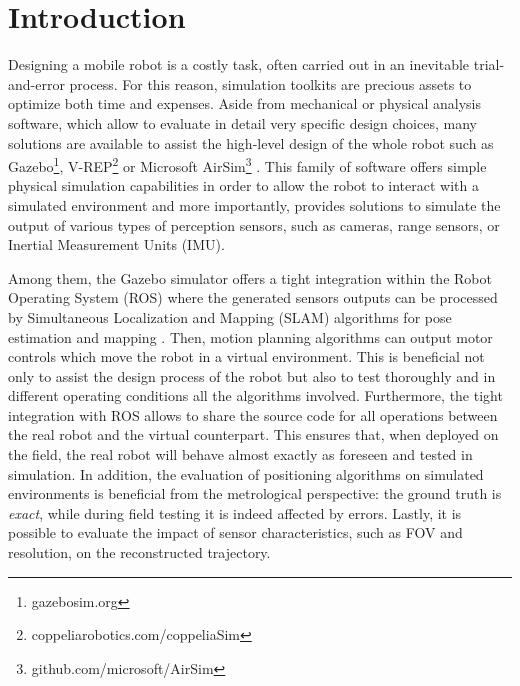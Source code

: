 \documentclass[conference]{IEEEtran}  %
\begin{document}
\section{Introduction}
Designing a mobile robot is a costly task, often carried out in an inevitable trial-and-error process. For this reason, simulation toolkits are precious assets to optimize both time and expenses. Aside from mechanical or physical analysis software, which allow to evaluate in detail very specific design choices, many solutions are available to assist the high-level design of the whole robot such as Gazebo\footnote{gazebosim.org}, V-REP\footnote{coppeliarobotics.com/coppeliaSim} or Microsoft AirSim\footnote{github.com/microsoft/AirSim} \cite{shah2018airsim}. This family of software offers simple physical simulation capabilities in order to allow the robot to interact with a simulated environment and more importantly, provides solutions to simulate the output of various types of perception sensors, such as cameras, range sensors, or Inertial Measurement Units (IMU).

Among them, the Gazebo simulator offers a tight integration within the Robot Operating System (ROS) where the generated sensors outputs can be processed by Simultaneous Localization and Mapping (SLAM) algorithms for pose estimation and mapping \cite{giubilato2020relocalization,chiodini2020retrieving,chiodini2019rover,giubilato2019evaluation}. Then, motion planning algorithms can output motor controls which move the robot in a virtual environment.
This is beneficial not only to assist the design process of the robot but also to test thoroughly and in different operating conditions all the algorithms involved. Furthermore, the tight integration with ROS allows to share the source code for all operations between the real robot and the virtual counterpart. This ensures that, when deployed on the field, the real robot will behave almost exactly as foreseen and tested in simulation.
In addition, the evaluation of positioning algorithms on simulated environments is beneficial from the metrological perspective: the ground truth is \textit{exact}, while during field testing it is indeed affected by errors. Lastly, it is possible to evaluate the impact of sensor characteristics, such as FOV and resolution, on the reconstructed trajectory.
\end{document}
